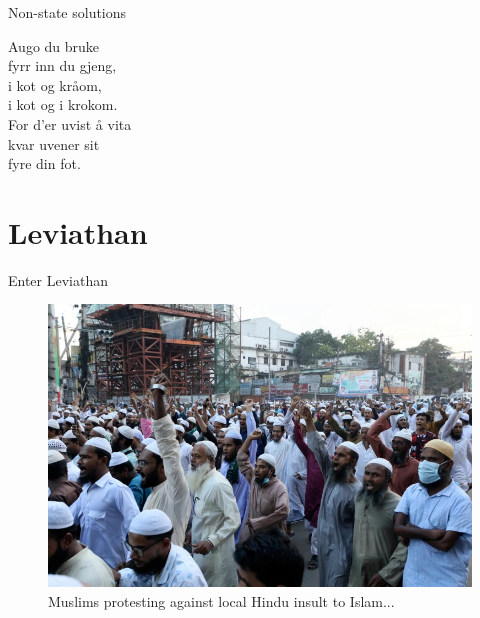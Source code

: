 \documentclass{beamer}
\begin{document}
\begin{frame}{Non-state solutions}

	\begin{block}{}
		Augo du bruke \\
		fyrr inn du gjeng, \\
		i kot og kråom,\\
		i kot og i krokom.\\
		For d'er uvist å vita \\
		kvar uvener sit\\
		fyre din fot.
	\end{block}

\end{frame}

\section{Leviathan}

\begin{frame}{Enter Leviathan}

\begin{figure}[htpb]
	\centering
	\includegraphics[width=\linewidth]{img/ap.png}
	\caption{Muslims protesting against local Hindu insult to Islam...}%
	\label{ap}
\end{figure}	

\end{frame}
\end{document}
